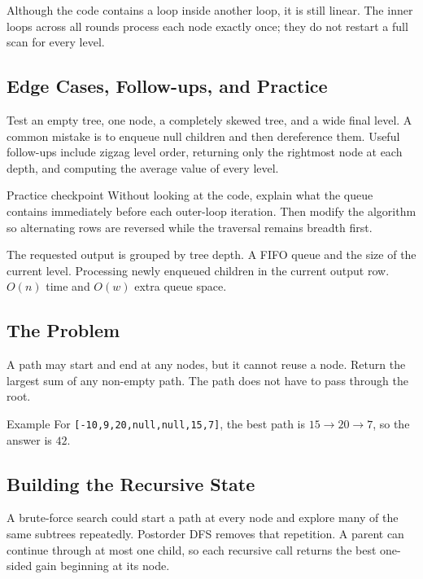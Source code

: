 Although the code contains a loop inside another loop, it is still linear.
The inner loops across all rounds process each node exactly once; they do not
restart a full scan for every level.

\subsection{Edge Cases, Follow-ups, and Practice}
Test an empty tree, one node, a completely skewed tree, and a wide final
level. A common mistake is to enqueue null children and then dereference them.
Useful follow-ups include zigzag level order, returning only the rightmost
node at each depth, and computing the average value of every level.

\begin{revisionbox}{Practice checkpoint}
Without looking at the code, explain what the queue contains immediately
before each outer-loop iteration. Then modify the algorithm so alternating
rows are reversed while the traversal remains breadth first.
\end{revisionbox}
\chaptercheckpoint
  {The requested output is grouped by tree depth.}
  {A FIFO queue and the size of the current level.}
  {Processing newly enqueued children in the current output row.}
  {$O(n)$ time and $O(w)$ extra queue space.}
\judgeclassnote



\subsection{The Problem}
A path may start and end at any nodes, but it cannot reuse a node. Return the
largest sum of any non-empty path. The path does not have to pass through the
root.

\begin{conceptbox}{Example}
For \texttt{[-10,9,20,null,null,15,7]}, the best path is
\(15\rightarrow20\rightarrow7\), so the answer is \(42\).
\end{conceptbox}

\subsection{Building the Recursive State}
A brute-force search could start a path at every node and explore many of the
same subtrees repeatedly. Postorder DFS removes that repetition. A parent can
continue through at most one child, so each recursive call returns the best
one-sided gain beginning at its node.

